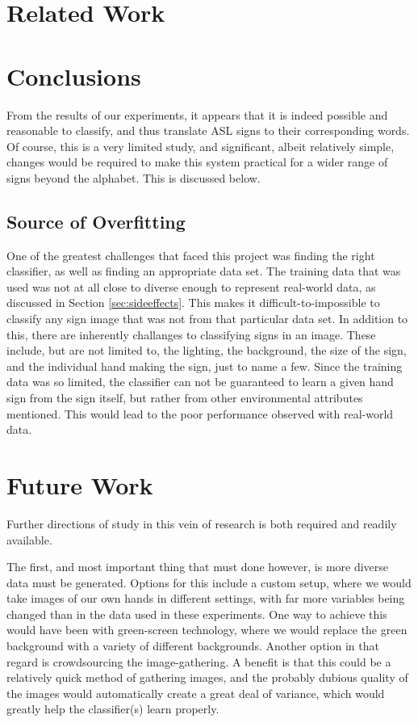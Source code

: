 \documentclass[10pt,Times New Roman]{article}
\begin{document}
\section{Related Work}

\section{Conclusions}
From the results of our experiments, it appears that it is indeed possible and reasonable to
classify, and thus translate ASL signs to their corresponding words. Of course, this is a very
limited study, and significant, albeit relatively simple, changes would be required to make
this system practical for a wider range of signs beyond the alphabet. This is discussed below.
    
    \subsection{Source of Overfitting}
        One of the greatest challenges that faced this project was finding the right classifier,
        as well as finding an appropriate data set. The training data that was used was not at all
        close to diverse enough to represent real-world data, as discussed in Section 
        \ref{sec:sideeffects}. This makes it difficult-to-impossible to classify any sign image that
        was not from that particular data set. In addition to this, there are inherently challanges
        to classifying signs in an image. These include, but are not limited to, the lighting, the
        background, the size of the sign, and the individual hand making the sign, just to name a
        few. Since the training data was so limited, the classifier can not be guaranteed to
        learn a given hand sign from the sign itself, but rather from other environmental
        attributes mentioned. This would lead to the poor performance observed with real-world
        data.

\section{Future Work}
Further directions of study in this vein of research is both required and readily available. 

The first, and most important thing that must done however, is more diverse data must be generated.
Options for this include a custom setup, where we would take images of our own hands in different
settings, with far more variables being changed than in the data used in these experiments. One 
way to achieve this would have been with green-screen technology, where we would replace the green
background with a variety of different backgrounds. Another
option in that regard is crowdsourcing the image-gathering. A benefit is that this could be a 
relatively quick method of gathering images, and the probably dubious quality of the images would
automatically create a great deal of variance, which would greatly help the classifier(s) learn 
properly.
\end{document}

